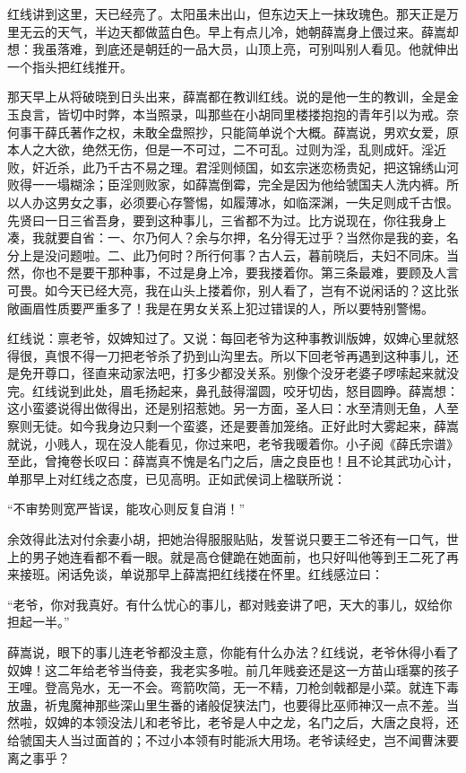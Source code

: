 红线讲到这里，天已经亮了。太阳虽未出山，但东边天上一抹玫瑰色。那天正是万里无云的天气，半边天都做蓝白色。早上有点儿冷，她朝薛嵩身上偎过来。薛嵩却想：我虽落难，到底还是朝廷的一品大员，山顶上亮，可别叫别人看见。他就伸出一个指头把红线推开。 

那天早上从将破晓到日头出来，薛嵩都在教训红线。说的是他一生的教训，全是金玉良言，皆切中时弊，本当照录，叫那些在小胡同里楼搂抱抱的青年引以为戒。奈何事干薛氏著作之权，未敢全盘照抄，只能简单说个大概。薛嵩说，男欢女爱，原本人之大欲，绝然无伤，但是一不可过，二不可乱。过则为淫，乱则成奸。淫近败，奸近杀，此乃千古不易之理。君淫则倾国，如玄宗迷恋杨贵妃，把这锦绣山河败得一一塌糊涂；臣淫则败家，如薛嵩倒霉，完全是因为他给虢国夫人洗内裤。所以人办这男女之事，必须要心存警惕，如履薄冰，如临深渊，一失足则成千古恨。先贤曰一日三省吾身，要到这种事儿，三省都不为过。比方说现在，你往我身上凑，我就要自省：一、尔乃何人？余与尔押，名分得无过乎？当然你是我的妾，名分上是没问题啦。二、此乃何时？所行何事？古人云，暮前晓后，夫妇不同床。当然，你也不是要干那种事，不过是身上冷，要我搂着你。第三条最难，要顾及人言可畏。如今天已经大亮，我在山头上搂着你，别人看了，岂有不说闲话的？这比张敞画眉性质要严重多了！我是在男女关系上犯过错误的人，所以要特别警惕。 

红线说：禀老爷，奴婢知过了。又说：每回老爷为这种事教训版婢，奴婢心里就怒得很，真恨不得一刀把老爷杀了扔到山沟里去。所以下回老爷再遇到这种事儿，还是免开尊口，径直来动家法吧，打多少都没关系。别像个没牙老婆子啰嗦起来就没完。红线说到此处，眉毛扬起来，鼻孔鼓得溜圆，咬牙切齿，怒目圆睁。薛嵩想：这小蛮婆说得出做得出，还是别招惹她。另一方面，圣人曰：水至清则无鱼，人至察则无徒。如今我身边只剩一个蛮婆，还是要善加笼络。正好此时大雾起来，薛嵩就说，小贱人，现在没人能看见，你过来吧，老爷我暖着你。小子阅《薛氏宗谱》至此，曾掩卷长叹曰：薛嵩真不愧是名门之后，唐之良臣也！且不论其武功心计，单那早上对红线之态度，已见高明。正如武侯词上楹联所说： 

“不审势则宽严皆误，能攻心则反复自消！” 

余效得此法对付余妻小胡，把她治得服服贴贴，发誓说只要王二爷还有一口气，世上的男子她连看都不看一眼。就是高仓健跪在她面前，也只好叫他等到王二死了再来接班。闲话免谈，单说那早上薛嵩把红线搂在怀里。红线感泣曰： 

“老爷，你对我真好。有什么忧心的事儿，都对贱妾讲了吧，天大的事儿，奴给你担起一半。” 

薛嵩说，眼下的事儿连老爷都没主意，你能有什么办法？红线说，老爷休得小看了奴婢！这二年给老爷当侍妾，我老实多啦。前几年贱妾还是这一方苗山瑶寨的孩子王哩。登高凫水，无一不会。弯箭吹简，无一不精，刀枪剑戟都是小菜。就连下毒放蛊，祈鬼魔神那些深山里生番的诸般促狭法门，也要得比巫师神汉一点不差。当然啦，奴婢的本领没法儿和老爷比，老爷是人中之龙，名门之后，大唐之良将，还给虢国夫人当过面首的；不过小本领有时能派大用场。老爷读经史，岂不闻曹沫要离之事乎？ 

